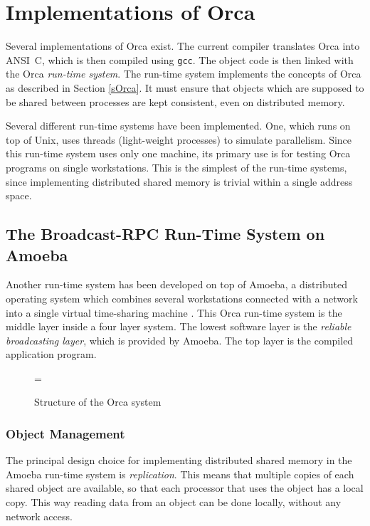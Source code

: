 \section{Implementations of Orca}
\label{sOrcaImp}

Several implementations of Orca exist. The current compiler translates
Orca into ANSI~C, which is then compiled using {\tt gcc}.  The object
code is then linked with the Orca {\em run-time system}.
The run-time system implements the concepts of Orca as described in
Section \ref{sOrca}. It must ensure that objects
which are supposed to be shared between processes are kept
consistent, even on distributed memory.

Several different run-time systems have been implemented.
One, which runs on top of Unix, uses
threads (light-weight processes) to simulate parallelism. Since this
run-time system uses only one machine, its primary use is for testing
Orca programs on single workstations. This is the simplest of the
run-time systems, since 
implementing distributed shared memory is trivial within a single
address space.

\subsection{The Broadcast-RPC Run-Time System on Amoeba}

Another run-time system has been developed on top of Amoeba,
a distributed operating system which combines several
workstations connected with a network into a single virtual time-sharing
machine \cite{Amoeba}.
This Orca run-time system \cite{ieee92,cpe92} is the middle layer inside
a four layer
system. The lowest software layer is the {\em reliable broadcasting layer},
which
is provided by Amoeba. The top layer is the compiled application
program.

\begin{figure}
\epsfxsize=\textwidth
{}
\caption{Structure of the Orca system}
\label{fOrcaStructure}
\end{figure}

\subsubsection{Object Management}

The principal design choice for implementing distributed shared memory in the
Amoeba run-time system is {\em replication}.
This means that multiple copies of each shared object are
available, so that each processor that uses the object has a local copy. This 
way reading data from
an object can be done locally, without any network access.

